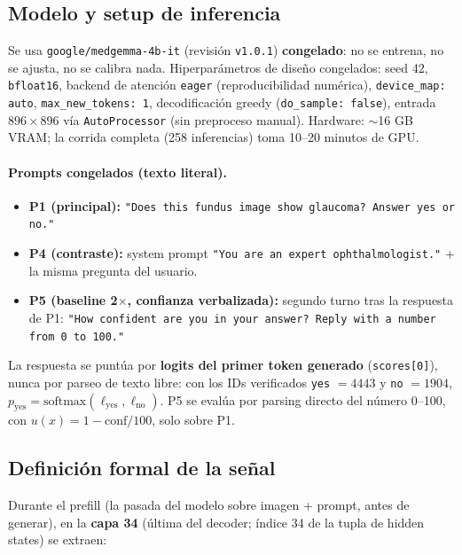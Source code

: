 \documentclass[12pt,a4paper]{article}
\newcommand{\ux}{u(x)}
\begin{document}
\subsection{Modelo y setup de inferencia}

Se usa \texttt{google/medgemma-4b-it} (revisión \texttt{v1.0.1})
\textbf{congelado}: no se entrena, no se ajusta, no se calibra nada.
Hiperparámetros de diseño congelados: seed 42, \texttt{bfloat16}, backend
de atención \texttt{eager} (reproducibilidad numérica),
\texttt{device\_map: auto}, \texttt{max\_new\_tokens: 1}, decodificación
greedy (\texttt{do\_sample: false}), entrada $896\times896$ vía
\texttt{AutoProcessor} (sin preproceso manual). Hardware: $\sim$16 GB VRAM;
la corrida completa (258 inferencias) toma 10--20 minutos de GPU.

\paragraph{Prompts congelados (texto literal).}
\begin{itemize}[leftmargin=1.4em]
    \item \textbf{P1 (principal):} \texttt{"Does this fundus image show
    glaucoma? Answer yes or no."}
    \item \textbf{P4 (contraste):} system prompt \texttt{"You are an
    expert ophthalmologist."} + la misma pregunta del usuario.
    \item \textbf{P5 (baseline 2$\times$, confianza verbalizada):} segundo
    turno tras la respuesta de P1: \texttt{"How confident are you in your
    answer? Reply with a number from 0 to 100."}
\end{itemize}

La respuesta se puntúa por \textbf{logits del primer token generado}
(\texttt{scores[0]}), nunca por parseo de texto libre: con los IDs
verificados \texttt{yes} $= 4443$ y \texttt{no} $= 1904$,
$p_{\mathrm{yes}} = \mathrm{softmax}(\ell_{\mathrm{yes}},
\ell_{\mathrm{no}})$. P5 se evalúa por parsing directo del número 0--100,
con $\ux = 1 - \mathrm{conf}/100$, solo sobre P1.

\subsection{Definición formal de la señal}
\label{sec:senal}

Durante el prefill (la pasada del modelo sobre imagen + prompt, antes de
generar), en la \textbf{capa 34} (última del decoder; índice 34 de la
tupla de hidden states) se extraen:
\end{document}
